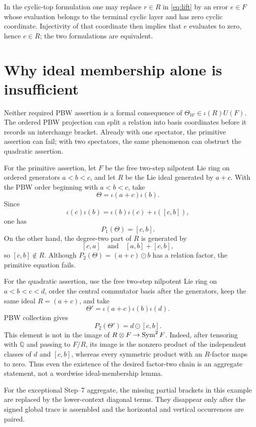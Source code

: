 \documentclass[11pt]{article}
\newcommand{\Sym}{\mathop{\rm Sym}}
\begin{document}
In the cyclic-top formulation one may replace $r\in R$ in
\eqref{eq:lift} by an error $e\in F$ whose evaluation belongs to the terminal
cyclic layer and has zero cyclic coordinate.  Injectivity of that coordinate
then implies that $e$ evaluates to zero, hence $e\in R$; the two formulations
are equivalent.

\section{Why ideal membership alone is insufficient}

Neither required PBW assertion is a formal consequence of
$\Theta_{\mathcal W}\in\iota(R)U(F)$.  The ordered PBW projection can split a
relation into basis coordinates before it records an interchange bracket.
Already with one spectator, the primitive assertion can fail; with two
spectators, the same phenomenon can obstruct the quadratic assertion.

For the primitive assertion, let $F$ be the free two-step nilpotent Lie ring
on ordered generators $a<b<c$, and let $R$ be the Lie ideal generated by
$a+c$.  With the PBW order beginning with $a<b<c$, take
\[
       \Theta=\iota(a+c)\iota(b).
\]
Since
\[
 \iota(c)\iota(b)=\iota(b)\iota(c)+\iota([c,b]),
\]
one has
\[
       P_1(\Theta)=[c,b].
\]
On the other hand, the degree-two part of $R$ is generated by
\[
       [c,a]
       \quad\text{and}\quad
       [a,b]+[c,b],
\]
so $[c,b]\notin R$.  Although
$P_2(\Theta)=(a+c)\odot b$ has a relation factor, the primitive equation
fails.

For the quadratic assertion, use the free two-step nilpotent Lie ring on
$a<b<c<d$, order the central commutator basis after the generators, keep the
same ideal $R=(a+c)$, and take
\[
       \Theta'=\iota(a+c)\iota(b)\iota(d).
\]
PBW collection gives
\[
       P_2(\Theta')=d\odot[c,b].
\]
This element is not in the image of
$R\otimes F\to\Sym^2F$.  Indeed, after tensoring with $\mathbb Q$ and passing
to $F/R$, its image is the nonzero product of the independent classes of
$d$ and $[c,b]$, whereas every symmetric product with an $R$-factor maps to
zero.  Thus even the existence of the desired factor-two chain is an
aggregate statement, not a wordwise ideal-membership lemma.

For the exceptional Step--7 aggregate, the missing partial brackets in this
example are replaced by the lower-context diagonal terms.  They disappear
only after the signed global trace is assembled and the horizontal and
vertical occurrences are paired.
\end{document}
